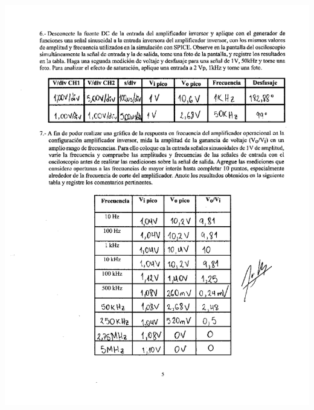 \documentclass[12pt]{article}
\begin{document}
	\includegraphics[width=16cm,height=21cm]{Img/lab_9_page-0002}\\
	
\end{document}
